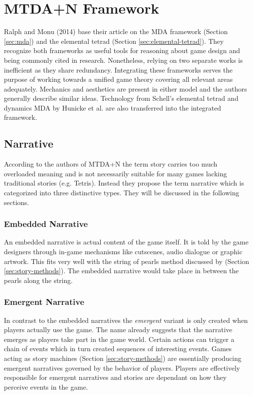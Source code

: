 \section{MTDA+N Framework} \label{sec:mtda+n}
Ralph and Monu (2014) \cite{Ralph2014} base their article on the MDA framework (Section \ref{sec:mda}) and the elemental tetrad (Section \ref{sec:elemental-tetrad}).
They recognize both frameworks as useful tools for reasoning about game design and being commonly cited in research.
Nonetheless, relying on two separate works is inefficient as they share redundancy.
Integrating these frameworks serves the purpose of working towards a unified game theory covering all relevant areas adequately.
Mechanics and aesthetics are present in either model and the authors generally describe similar ideas.
Technology from Schell's elemental tetrad \cite{Schell2014} and dynamics MDA by Hunicke et al. \cite{Hunicke2004} are also transferred into the integrated framework.

\subsection{Narrative}
According to the authors of MTDA+N the term story carries too much overloaded meaning and is not necessarily suitable for many games lacking traditional stories (e.g. Tetris).
Instead they propose the term narrative which is categorized into three distinctive types.
They will be discussed in the following sections.

\subsubsection{Embedded Narrative}
An embedded narrative is actual content of the game itself.
It is told by the game designers through in-game mechanisms like cutscenes, audio dialogue or graphic artwork.
This fits very well with the string of pearls method discussed by \citeauthor{Schell2014} (Section \ref{sec:story-methods}).
The embedded narrative would take place in between the pearls along the string.

\subsubsection{Emergent Narrative}
In contrast to the embedded narratives the \textit{emergent} variant is only created when players actually use the game.
The name already suggests that the narrative emerges as players take part in the game world.
Certain actions can trigger a chain of events which in turn created sequences of interesting events.
Games acting as story machines (Section \ref{sec:story-methods}) are essentially producing emergent narratives governed by the behavior of players.
Players are effectively responsible for emergent narratives and stories are dependant on how they perceive events in the game.

